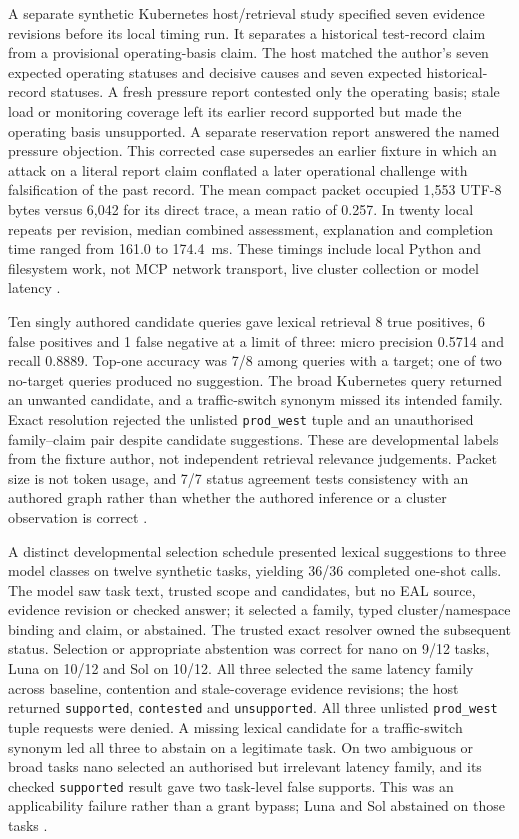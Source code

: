 \documentclass[preprint,12pt]{elsarticle}
\begin{document}
A separate synthetic Kubernetes host/retrieval study specified seven evidence revisions before its local timing run. It separates a historical test-record claim from a provisional operating-basis claim. The host matched the author's seven expected operating statuses and decisive causes and seven expected historical-record statuses. A fresh pressure report contested only the operating basis; stale load or monitoring coverage left its earlier record supported but made the operating basis unsupported. A separate reservation report answered the named pressure objection. This corrected case supersedes an earlier fixture in which an attack on a literal report claim conflated a later operational challenge with falsification of the past record. The mean compact packet occupied 1,553 UTF-8 bytes versus 6,042 for its direct trace, a mean ratio of 0.257. In twenty local repeats per revision, median combined assessment, explanation and completion time ranged from 161.0 to 174.4~ms. These timings include local Python and filesystem work, not MCP network transport, live cluster collection or model latency \citep{earlKubeOffline}.

Ten singly authored candidate queries gave lexical retrieval 8 true positives, 6 false positives and 1 false negative at a limit of three: micro precision 0.5714 and recall 0.8889. Top-one accuracy was 7/8 among queries with a target; one of two no-target queries produced no suggestion. The broad Kubernetes query returned an unwanted candidate, and a traffic-switch synonym missed its intended family. Exact resolution rejected the unlisted \texttt{prod\_west} tuple and an unauthorised family--claim pair despite candidate suggestions. These are developmental labels from the fixture author, not independent retrieval relevance judgements. Packet size is not token usage, and 7/7 status agreement tests consistency with an authored graph rather than whether the authored inference or a cluster observation is correct \citep{earlKubeOffline}.

A distinct developmental selection schedule presented lexical suggestions to three model classes on twelve synthetic tasks, yielding 36/36 completed one-shot calls. The model saw task text, trusted scope and candidates, but no EAL source, evidence revision or checked answer; it selected a family, typed cluster/namespace binding and claim, or abstained. The trusted exact resolver owned the subsequent status. Selection or appropriate abstention was correct for nano on 9/12 tasks, Luna on 10/12 and Sol on 10/12. All three selected the same latency family across baseline, contention and stale-coverage evidence revisions; the host returned \texttt{supported}, \texttt{contested} and \texttt{unsupported}. All three unlisted \texttt{prod\_west} tuple requests were denied. A missing lexical candidate for a traffic-switch synonym led all three to abstain on a legitimate task. On two ambiguous or broad tasks nano selected an authorised but irrelevant latency family, and its checked \texttt{supported} result gave two task-level false supports. This was an applicability failure rather than a grant bypass; Luna and Sol abstained on those tasks \citep{earlFamilySelection}.
\end{document}
